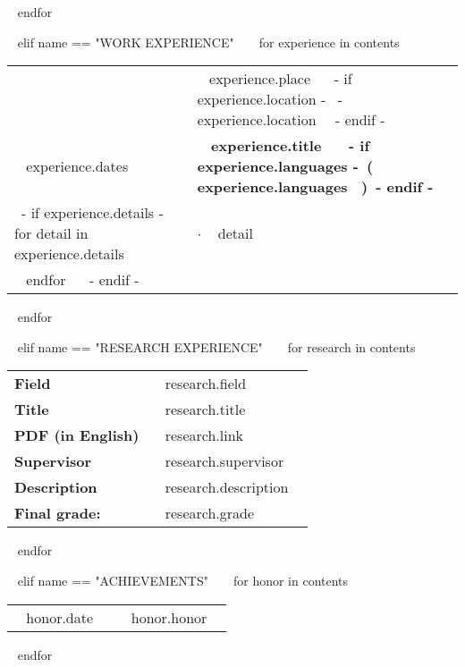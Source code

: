   ~{ endfor }~
  \vspace{2mm}

~{ elif name == "WORK EXPERIENCE" }~
  ~{ for experience in contents }~
    \begin{tabular}{ @{} p{32mm} p{135mm} @{} }
    & \small ~{{ experience.place }}~ ~{- if experience.location -}~ \small \hspace{1mm}- ~{{ experience.location }}~~{- endif -}~\\
    \small ~{{ experience.dates }}~ & \bf\small ~{{ experience.title }}~ ~{- if experience.languages -}~\small\hspace{1mm}\bf\color{maincolor}(~{{ experience.languages }}~)~{- endif -}~\\
    ~{- if experience.details -}~
      ~{ for detail in experience.details }~
        & $\cdot$ \small ~{{ detail }}~ \\
      ~{ endfor }~
    ~{- endif -}~
    \end{tabular}
    \vspace{2mm}
  ~{ endfor }~
  \vspace{20mm}

~{ elif name == "RESEARCH EXPERIENCE" }~
  ~{ for research in contents }~
    \begin{tabular}{ @{} p{32mm} p{135mm} @{} }

    \small \bf Field & \small ~{{ research.field }}~ \\
    \small \bf Title & \small ~{{ research.title }}~ \\
    \small \bf PDF (in English) & \small ~{{ research.link }}~ \\
    \small \bf Supervisor & \small ~{{ research.supervisor }}~ \\
    \small \bf Description & \small ~{{ research.description }}~ \\
    \small \bf \small \color{maingrey} Final grade: & \small \color{maingrey} ~{{ research.grade }}~ \\
    
    \end{tabular}
    \vspace{1mm}
  ~{ endfor }~
  \vspace{4mm}

~{ elif name == "ACHIEVEMENTS" }~
  ~{ for honor in contents }~
    \begin{tabular}{ @{} p{32mm} p{135mm} @{} }
    {~{{ honor.date }}~} & {\small ~{{ honor.honor }}~}
    \end{tabular}
    \vspace{1mm}
  ~{ endfor }~

